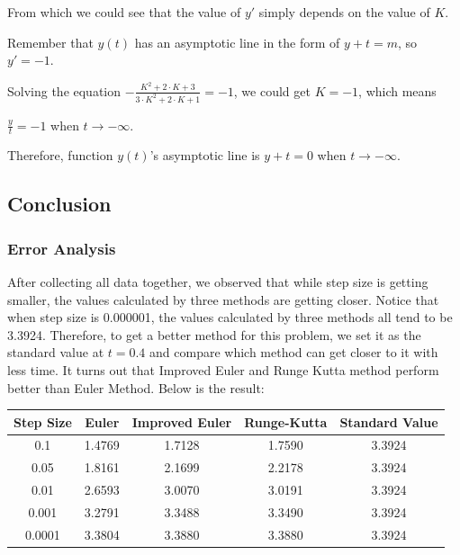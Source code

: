 \documentclass[11pt,a4paper]{article}
\begin{document}
	From which we could see that the value of $y'$ simply depends on the value of $K$.
	
	Remember that $y(t)$ has an asymptotic line in the form of $y+t=m$, so $y'=-1$.
	
	Solving the equation $-\frac{K^2+2\cdot K+3}{3\cdot K^2+ 2\cdot K +1}=-1$, we could get $K=-1$, which means 
	
	\begin{center}
		$\frac{y}{t}=-1$ when $t\rightarrow -\infty$.
	\end{center}

	Therefore, function $y(t)$'s asymptotic line is $y+t=0$ when $t \rightarrow -\infty$.
	



\subsection{Conclusion}

\subsubsection{Error Analysis}

After collecting all data together, we observed that while step size is getting smaller, the values calculated by three methods are getting closer. Notice that when step size is 0.000001, the values calculated by three methods all tend to be 3.3924. Therefore, to get a better method for this problem, we set it as the standard value at $t = 0.4$ and compare which method can get closer to it with less time. It turns out that Improved Euler and Runge Kutta method perform better than Euler Method. Below is the result:

\begin{table}[H]
	\centering
	\begin{tabular}{c|c|c|c|c}
		Step Size & Euler  & Improved Euler & Runge-Kutta & Standard Value \\ \hline
		0.1       & 1.4769 & 1.7128         & 1.7590      & 3.3924         \\ \hline
		0.05      & 1.8161 & 2.1699         & 2.2178      & 3.3924         \\ \hline
		0.01      & 2.6593 & 3.0070         & 3.0191      & 3.3924         \\ \hline
		0.001     & 3.2791 & 3.3488         & 3.3490      & 3.3924         \\ \hline
		0.0001    & 3.3804 & 3.3880         & 3.3880      & 3.3924        
	\end{tabular}
\end{table}
\end{document}
